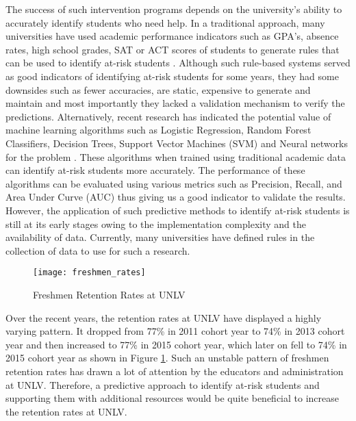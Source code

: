 \documentclass[11pt,openright]{report}
\begin{document}
The success of such intervention programs depends on the university's ability to accurately identify students who need help. In a traditional approach, many universities have used academic performance indicators such as GPA's, absence rates, high school grades, SAT or ACT scores of students to generate rules that can be used to identify at-risk  students \cite{bingham2016}. Although such rule-based systems served as good indicators of identifying at-risk students for some years, they had some downsides such as fewer accuracies, are static, expensive to generate and maintain and most importantly they lacked a validation mechanism to verify the predictions. Alternatively, recent research has indicated the potential value of machine learning algorithms such as Logistic Regression, Random Forest Classifiers, Decision Trees, Support Vector Machines (SVM) and Neural networks for the problem \cite{plagge2013using,lakkaraju2015machine,marbouti2016models}. These algorithms when trained using traditional academic data can identify at-risk students more accurately. The performance of these algorithms can be evaluated using various metrics such as Precision, Recall, and Area Under Curve (AUC) thus giving us a good indicator to validate the results. However, the application of such predictive methods to identify at-risk students is still at its early stages owing to the implementation complexity and the availability of data. Currently, many universities have defined rules in the collection of data to use for such a research.
\begin{figure}
	\centering
	\texttt{[image: freshmen\_rates]}
	\caption{Freshmen Retention Rates at UNLV}
	\label{fig:unlv_retention_trend}
\end{figure}

Over the recent years, the retention rates at UNLV have displayed a highly varying pattern. It dropped from 77\% in 2011 cohort year to 74\% in 2013 cohort year and then increased to 77\% in 2015 cohort year, which later on fell to 74\% in 2015 cohort year as shown in Figure \ref{fig:unlv_retention_trend}. Such an unstable pattern of freshmen retention rates has drawn a lot of attention by the educators and administration at UNLV. Therefore, a predictive approach to identify at-risk students and supporting them with additional resources would be quite beneficial to increase the retention rates at UNLV. 
\end{document}
